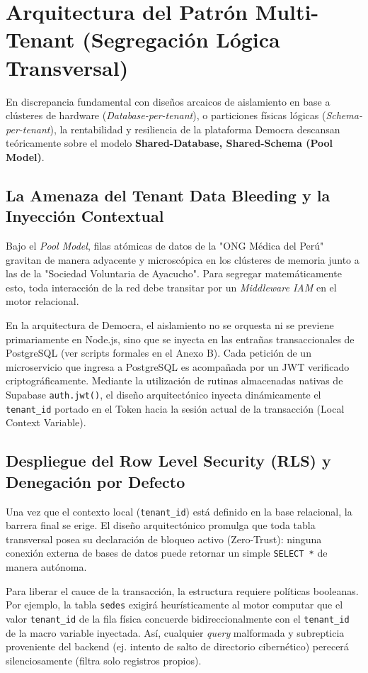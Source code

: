 \documentclass[11pt,a4paper,oneside]{report}
\begin{document}
\section{Arquitectura del Patr\'on Multi-Tenant (Segregaci\'on L\'ogica Transversal)}
En discrepancia fundamental con dise\~nos arcaicos de aislamiento en base a cl\'usteres de hardware (\textit{Database-per-tenant}), o particiones f\'isicas l\'ogicas (\textit{Schema-per-tenant}), la rentabilidad y resiliencia de la plataforma Democra descansan te\'oricamente sobre el modelo \textbf{Shared-Database, Shared-Schema (Pool Model)}. 

\subsection{La Amenaza del Tenant Data Bleeding y la Inyecci\'on Contextual}
Bajo el \textit{Pool Model}, filas at\'omicas de datos de la "ONG M\'edica del Per\'u" gravitan de manera adyacente y microsc\'opica en los cl\'usteres de memoria junto a las de la "Sociedad Voluntaria de Ayacucho". Para segregar matem\'aticamente esto, toda interacci\'on de la red debe transitar por un \textit{Middleware IAM} en el motor relacional.

En la arquitectura de Democra, el aislamiento no se orquesta ni se previene primariamente en Node.js, sino que se inyecta en las entra\~nas transaccionales de PostgreSQL (ver scripts formales en el Anexo B). Cada petici\'on de un microservicio que ingresa a PostgreSQL es acompa\~nada por un JWT verificado criptogr\'aficamente. Mediante la utilizaci\'on de rutinas almacenadas nativas de Supabase \texttt{auth.jwt()}, el dise\~no arquitect\'onico inyecta din\'amicamente el \texttt{tenant\_id} portado en el Token hacia la sesi\'on actual de la transacci\'on (Local Context Variable).

\subsection{Despliegue del Row Level Security (RLS) y Denegaci\'on por Defecto}
Una vez que el contexto local (\texttt{tenant\_id}) est\'a definido en la base relacional, la barrera final se erige. El dise\~no arquitect\'onico promulga que toda tabla transversal posea su declaraci\'on de bloqueo activo (Zero-Trust): ninguna conexi\'on externa de bases de datos puede retornar un simple \texttt{SELECT *} de manera aut\'onoma.

Para liberar el cauce de la transacci\'on, la estructura requiere pol\'iticas booleanas. Por ejemplo, la tabla \texttt{sedes} exigir\'a heur\'isticamente al motor computar que el valor \texttt{tenant\_id} de la fila f\'isica concuerde bidireccionalmente con el \texttt{tenant\_id} de la macro variable inyectada. As\'i, cualquier \textit{query} malformada y subrepticia proveniente del backend (ej. intento de salto de directorio cibern\'etico) perecer\'a silenciosamente (filtra solo registros propios).
\end{document}
